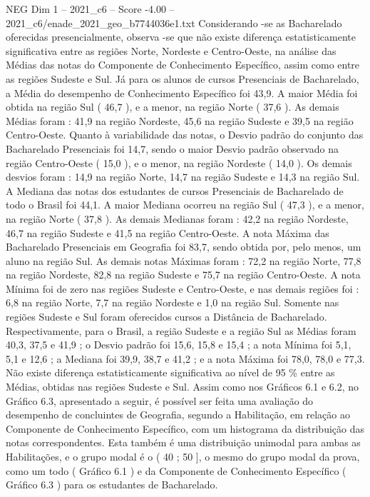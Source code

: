 \begin{textsample}{NEG Dim 1 – 2021\_c6 – Score -4.00 – 2021\_c6/enade\_2021\_geo\_b7744036e1.txt}
Considerando -se as Bacharelado oferecidas presencialmente, observa -se que não existe diferença estatisticamente significativa entre as regiões Norte, Nordeste e Centro-Oeste, na análise das Médias das notas do Componente de Conhecimento Específico, assim como entre as regiões Sudeste e Sul.
Já para os alunos de cursos Presenciais de Bacharelado, a Média do desempenho de Conhecimento Específico foi 43,9.
A maior Média foi obtida na região Sul ( 46,7 ), e a menor, na região Norte ( 37,6 ).
As demais Médias foram : 41,9 na região Nordeste, 45,6 na região Sudeste e 39,5 na região Centro-Oeste.
Quanto à variabilidade das notas, o Desvio padrão do conjunto das Bacharelado Presenciais foi 14,7, sendo o maior Desvio padrão observado na região Centro-Oeste ( 15,0 ), e o menor, na região Nordeste ( 14,0 ).
Os demais desvios foram : 14,9 na região Norte, 14,7 na região Sudeste e 14,3 na região Sul.
A Mediana das notas dos estudantes de cursos Presenciais de Bacharelado de todo o Brasil foi 44,1.
A maior Mediana ocorreu na região Sul ( 47,3 ), e a menor, na região Norte ( 37,8 ).
As demais Medianas foram : 42,2 na região Nordeste, 46,7 na região Sudeste e 41,5 na região Centro-Oeste.
A nota Máxima das Bacharelado Presenciais em Geografia foi 83,7, sendo obtida por, pelo menos, um aluno na região Sul.
As demais notas Máximas foram : 72,2 na região Norte, 77,8 na região Nordeste, 82,8 na região Sudeste e 75,7 na região Centro-Oeste.
A nota Mínima foi de zero nas regiões Sudeste e Centro-Oeste, e nas demais regiões foi : 6,8 na região Norte, 7,7 na região Nordeste e 1,0 na região Sul.
Somente nas regiões Sudeste e Sul foram oferecidos cursos a Distância de Bacharelado.
Respectivamente, para o Brasil, a região Sudeste e a região Sul as Médias foram 40,3, 37,5 e 41,9 ; o Desvio padrão foi 15,6, 15,8 e 15,4 ; a nota Mínima foi 5,1, 5,1 e 12,6 ; a Mediana foi 39,9, 38,7 e 41,2 ; e a nota Máxima foi 78,0, 78,0 e 77,3.
Não existe diferença estatisticamente significativa ao nível de 95 \% entre as Médias, obtidas nas regiões Sudeste e Sul.
Assim como nos Gráficos 6.1 e 6.2, no Gráfico 6.3, apresentado a seguir, é possível ser feita uma avaliação do desempenho de concluintes de Geografia, segundo a Habilitação, em relação ao Componente de Conhecimento Específico, com um histograma da distribuição das notas correspondentes.
Esta também é uma distribuição unimodal para ambas as Habilitações, e o grupo modal é o ( 40 ; 50 ], o mesmo do grupo modal da prova, como um todo ( Gráfico 6.1 ) e da Componente de Conhecimento Específico ( Gráfico 6.3 ) para os estudantes de Bacharelado.

\end{textsample}
